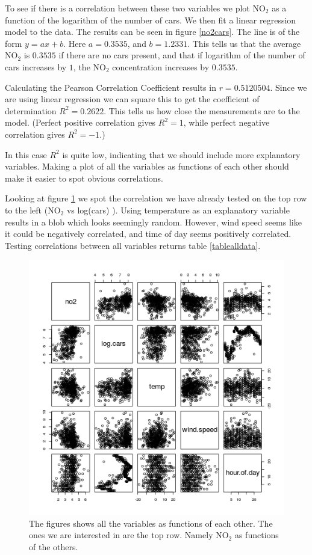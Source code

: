 \documentclass[a4paper]{article}
\begin{document}
To see if there is a correlation between these two variables we plot NO$_2$ as a function of the logarithm of the number of cars. We then fit a linear regression model to the data. The results can be seen in figure \ref{no2cars}. The line is of the form $y = ax + b$. Here $a = 0.3535$, and $b = 1.2331$. This tells us that the average NO$_2$ is $0.3535$ if there are no cars present, and that if logarithm of the number of cars increases by $1$, the NO$_2$ concentration increases by $0.3535$. 

Calculating the Pearson Correlation Coefficient results in $r = 0.5120504$. Since we are using linear regression we can square this to get the coefficient of determination $R^2 = 0.2622$. This tells us how close the measurements are to the model. (Perfect positive correlation gives $R^2 = 1$, while perfect negative correlation gives $R^2 = -1$.)

In this case $R^2$ is quite low, indicating that we should include more explanatory variables. Making a plot of all the variables as functions of each other should make it easier to spot obvious correlations.

Looking at figure \ref{alldata} we spot the correlation we have already tested on the top row to the left (NO$_2$ vs log(cars) ). Using temperature as an explanatory variable results in a blob which looks seemingly random. However, wind speed seems like it could be negatively correlated, and time of day seems positively correlated. 
Testing correlations between all variables returns table \ref{tablealldata}.

\begin{figure}[ht]
 \includegraphics[width=.99\textwidth]{alldata.png}
 \caption{The figures shows all the variables as functions of each other. The ones we are interested in are the top row. Namely NO$_2$ as functions of the others.}
 \label{alldata}
\end{figure}
\end{document}
